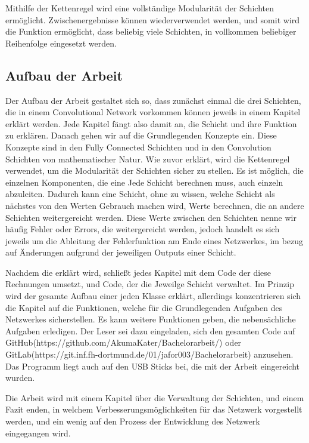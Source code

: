 \documentclass[12pt]{article}
\begin{document}
Mithilfe der Kettenregel wird eine vollständige Modularität der Schichten ermöglicht. Zwischenergebnisse können wiederverwendet werden, und somit wird die Funktion ermöglicht, dass beliebig viele Schichten, in vollkommen beliebiger Reihenfolge eingesetzt werden. 

\subsection{Aufbau der Arbeit}
Der Aufbau der Arbeit gestaltet sich so, dass zunächst einmal die drei Schichten, die in einem Convolutional Network vorkommen können jeweils in einem Kapitel erklärt werden. Jede Kapitel fängt also damit an, die Schicht und ihre Funktion zu erklären. Danach gehen wir auf die Grundlegenden Konzepte ein. Diese Konzepte sind in den Fully Connected Schichten und in den Convolution Schichten von mathematischer Natur. Wie zuvor erklärt, wird die Kettenregel verwendet, um die Modularität der Schichten sicher zu stellen. Es ist möglich, die einzelnen Komponenten, die eine Jede Schicht berechnen muss, auch einzeln abzuleiten. Dadurch kann eine Schicht, ohne zu wissen, welche Schicht als nächstes von den Werten Gebrauch machen wird, Werte berechnen, die an andere Schichten weitergereicht werden. Diese Werte zwischen den Schichten nenne wir häufig Fehler oder Errors, die weitergereicht werden, jedoch handelt es sich jeweils um die Ableitung der Fehlerfunktion am Ende eines Netzwerkes, im bezug auf Änderungen aufgrund der jeweiligen Outputs einer Schicht.

Nachdem die erklärt wird, schließt jedes Kapitel mit dem Code der diese Rechnungen umsetzt, und Code, der die Jeweilge Schicht verwaltet. Im Prinzip wird der gesamte Aufbau einer jeden Klasse erklärt, allerdings konzentrieren sich die Kapitel auf die Funktionen, welche für die Grundlegenden Aufgaben des Netzwerkes sicherstellen. Es kann weitere Funktionen geben, die nebensächliche Aufgaben erledigen. Der Leser sei dazu eingeladen, sich den gesamten Code auf GitHub(https://github.com/AkumaKater/Bachelorarbeit/) oder GitLab(https://git.inf.fh-dortmund.de/01/jafor003/Bachelorarbeit) anzusehen. Das Programm liegt auch auf den USB Sticks bei, die mit der Arbeit eingereicht wurden.

Die Arbeit wird mit einem Kapitel über die Verwaltung der Schichten, und einem Fazit enden, in welchem Verbesserungsmöglichkeiten für das Netzwerk vorgestellt werden, und ein wenig auf den Prozess der Entwicklung des Netzwerk eingegangen wird.
\end{document}
